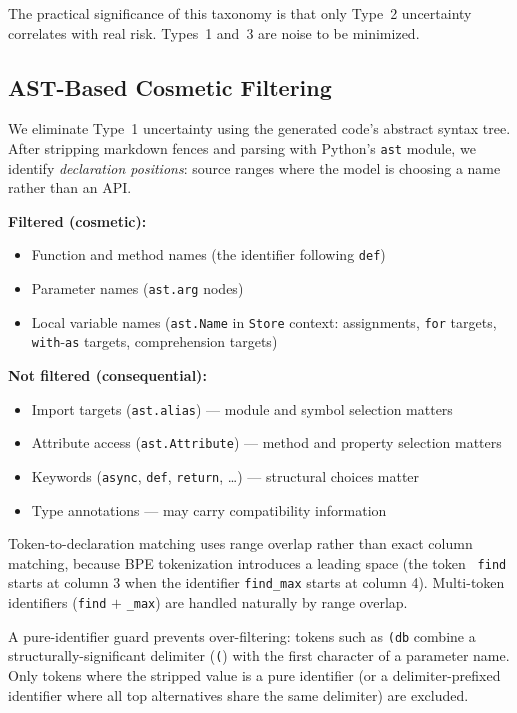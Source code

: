 The practical significance of this taxonomy is that only Type~2 uncertainty
correlates with real risk. Types~1 and~3 are noise to be minimized.

\subsection{AST-Based Cosmetic Filtering}
\label{sec:eps-filtering}

We eliminate Type~1 uncertainty using the generated code's abstract syntax
tree. After stripping markdown fences and parsing with Python's \texttt{ast}
module, we identify \emph{declaration positions}: source ranges where the
model is choosing a name rather than an API.

\textbf{Filtered (cosmetic):}
\begin{itemize}[noitemsep]
  \item Function and method names (the identifier following \texttt{def})
  \item Parameter names (\texttt{ast.arg} nodes)
  \item Local variable names (\texttt{ast.Name} in \texttt{Store} context:
    assignments, \texttt{for} targets, \texttt{with}-\texttt{as} targets,
    comprehension targets)
\end{itemize}

\textbf{Not filtered (consequential):}
\begin{itemize}[noitemsep]
  \item Import targets (\texttt{ast.alias}) --- module and symbol selection matters
  \item Attribute access (\texttt{ast.Attribute}) --- method and property selection matters
  \item Keywords (\texttt{async}, \texttt{def}, \texttt{return}, \ldots) --- structural choices matter
  \item Type annotations --- may carry compatibility information
\end{itemize}

Token-to-declaration matching uses range overlap rather than exact column
matching, because BPE tokenization introduces a leading space (the token
\texttt{~find} starts at column 3 when the identifier \texttt{find\_max}
starts at column 4). Multi-token identifiers (\texttt{find} $+$ \texttt{\_max})
are handled naturally by range overlap.

A pure-identifier guard prevents over-filtering: tokens such as \texttt{(db}
combine a structurally-significant delimiter (\texttt{(}) with the first
character of a parameter name. Only tokens where the stripped value is a
pure identifier (or a delimiter-prefixed identifier where all top alternatives
share the same delimiter) are excluded.

